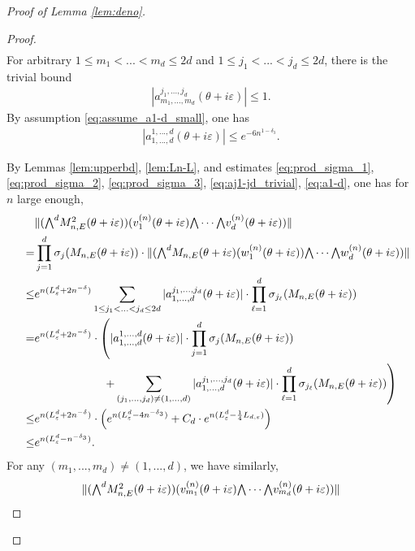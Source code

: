 \documentclass[11pt]{amsart}
\begin{document}
\begin{proof}[Proof of Lemma \ref{lem:deno}]
\begin{proof}
\begin{align}
\end{align}
For arbitrary $1\leq m_1<...<m_d\leq 2d$ and $1\leq j_1<...<j_d\leq 2d$, there is the trivial bound
\begin{align}\label{eq:aj1-jd_trivial}
    |a^{j_1,...,j_d}_{m_1,...,m_d}(\theta+i\varepsilon)|\leq 1.
\end{align}
By assumption \eqref{eq:assume_a1-d_small}, one has
\begin{align}\label{eq:a1-d}
    |a_{1,...,d}^{1,...,d}(\theta+i\varepsilon)|\leq e^{-6n^{1-\delta_3}}.
\end{align}

By Lemmas \ref{lem:upperbd}, \ref{lem:Ln-L}, and estimates \eqref{eq:prod_sigma_1}, \eqref{eq:prod_sigma_2}, \eqref{eq:prod_sigma_3}, \eqref{eq:aj1-jd_trivial}, \eqref{eq:a1-d}, one has  for $n$ large enough,
\begin{align}\label{eq:M2_v1-d}
    \qquad &\|(\textstyle{\bigwedge}^d M_{n,E}^2(\theta+i\varepsilon)) (v_{1}^{(n)}(\theta+i\varepsilon)\textstyle{\bigwedge} \cdots \textstyle{\bigwedge} v_{d}^{(n)}(\theta+i\varepsilon))\|\notag\\
=&\prod_{j=1}^d \sigma_j(M_{n,E}(\theta+i\varepsilon))\cdot  \|(\textstyle{\bigwedge}^d M_{n,E}(\theta+i\varepsilon) (w_{1}^{(n)}(\theta+i\varepsilon))\textstyle{\bigwedge}\cdots \textstyle{\bigwedge} w_{d}^{(n)}(\theta+i\varepsilon))\| \notag\\
\leq &e^{n(L^d_{\varepsilon}+2n^{-\delta})} \sum_{1\leq j_1<...<j_d\leq 2d} |a^{j_1,...,j_d}_{1,...,d}(\theta+i\varepsilon)|\cdot \prod_{\ell=1}^d \sigma_{j_{\ell}}(M_{n,E}(\theta+i\varepsilon))\notag\\
=&e^{n(L^d_{\varepsilon}+2n^{-\delta})} \cdot \left(|a_{1,...,d}^{1,...,d}(\theta+i\varepsilon)|\cdot \prod_{j=1}^d\sigma_j(M_{n,E}(\theta+i\varepsilon))\right.\\
&\qquad\qquad\qquad\left.+\sum_{(j_1,...,j_d)\neq (1,...,d)} |a^{j_1,...,j_d}_{1,...,d}(\theta+i\varepsilon)|\cdot \prod_{\ell=1}^d\sigma_{j_{\ell}}(M_{n,E}(\theta+i\varepsilon))\right)\notag\\
\leq &e^{n(L^d_{\varepsilon}+2n^{-\delta})} \cdot \left(e^{n(L^d_{\varepsilon}-4n^{-\delta_3})}+C_d \cdot e^{n(L^d_{\varepsilon}-\frac{1}{4}L_{d,\varepsilon})}\right)\notag\\
\leq &e^{n(L^d_{\varepsilon}-n^{-\delta_3})}.
\end{align}
For any $(m_1,...,m_d)\neq (1,...,d)$, we have similarly,
\begin{align}\label{eq:M2_vm1-md}
        &\|(\textstyle{\bigwedge}^d M_{n,E}^2(\theta+i\varepsilon)) (v_{m_1}^{(n)}(\theta+i\varepsilon)\textstyle{\bigwedge} \cdots \textstyle{\bigwedge} v_{m_d}^{(n)}(\theta+i\varepsilon))\|\notag\\

\end{align}
\end{proof}
\end{proof}
\end{document}
